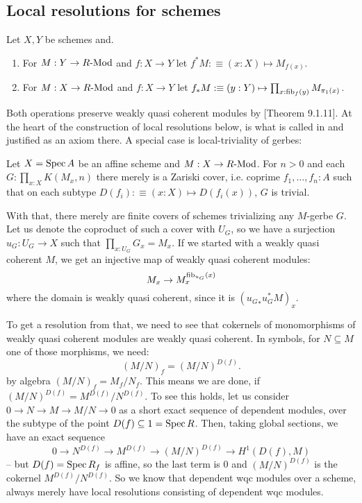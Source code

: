 
\subsection{Local resolutions for schemes}

\begin{definition}
  Let $X,Y$ be schemes and.
  \begin{enumerate}
  \item For $M:Y\to R\text{-}\mathrm{Mod}$ and $f:X\to Y$ let $f^*M:\equiv (x:X)\mapsto M_{f(x)}$.
  \item For $M:X\to R\text{-}\mathrm{Mod}$ and $f:X\to Y$ let $f_*M:\equiv (y:Y)\mapsto \prod_{x:\mathrm{fib}_f(y)}M_{\pi_1(x)}$.
  \end{enumerate}
\end{definition}

Both operations preserve weakly quasi coherent modules by \cite{draft}[Theorem 9.1.11].
At the heart of the construction of local resolutions below,
is what is called  in \cite{draft} and justified as an axiom there.
A special case is local-triviality of gerbes:

\begin{axiom}
  Let $X=\operatorname{Spec} A$ be an affine scheme and $M:X\to R\text{-}\mathrm{Mod}$.
  For $n>0$ and each $G:\prod_{x:X}K(M_x,n)$ there merely is a Zariski cover,
  i.e. coprime
  $f_1,\dots,f_n:A$ such that on each subtype $D(f_i):\equiv (x:X)\mapsto D(f_i(x))$,
  $G$ is trivial.
\end{axiom}

With that, there merely are finite covers of schemes trivializing any $M$-gerbe $G$.
Let us denote the coproduct of such a cover with $U_G$,
so we have a surjection $u_G:U_G\to X$ such that $\prod_{x:U_G}G_x=M_x$.
If we started with a weakly quasi coherent $M$,
we get an injective map of weakly quasi coherent modules:
\[
  M_x \to M_x^{\mathrm{fib}_{u_G}(x)}
\]
where the domain is weakly quasi coherent, since it is $({u_G}_*u_G^*M)_x$.

To get a resolution from that, we need to see that cokernels of monomorphisms
of weakly quasi coherent modules are weakly quasi coherent.
In symbols, for $N\subseteq M$ one of those morphisms, we need:
\[
  (M/N)_f=(M/N)^{D(f)}.
\]
by algebra $(M/N)_f=M_f/N_f$.
This means we are done, if $(M/N)^{D(f)}=M^{D(f)}/{N^{D(f)}}$.
To see this holds, let us consider $0\to N\to M\to M/N\to 0$ as a short exact sequence of dependent modules,
over the subtype of the point $D(f)\subseteq 1=\operatorname{Spec} R$.
Then, taking global sections, we have an exact sequence
\[
 0\to N^{D(f)}\to M^{D(f)}\to (M/N)^{D(f)}\to H^1(D(f),M)
\]
-- but $D(f)=\operatorname{Spec} R_f$ is affine,
so the last term is 0 and $(M/N)^{D(f)}$ is the cokernel $M^{D(f)}/N^{D(f)}$.
So we know that dependent wqc modules over a scheme,
always merely have local resolutions consisting of dependent wqc modules.


